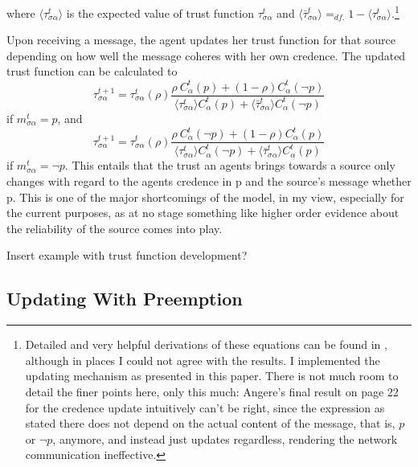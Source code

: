 \documentclass[11pt, a4paper]{article}
\newcommand{\sa}{{\sigma\alpha}}
\renewcommand{\a}{\alpha}
\begin{document}
where $\langle \tau^t_{\sa} \rangle $ is the expected value of trust function $ \tau^t_{\sa} $ and ${\langle \bar{\tau}^t_{\sa} \rangle =_{df.} 1 - \langle \tau^t_{\sa} \rangle}$.\footnote{Detailed and very helpful derivations of these equations can be found in \textcite{Angere2010}, although in places I could not agree with the results. I implemented the updating mechanism as presented in this paper. There is not much room to detail the finer points here, only this much: Angere's final result on page 22 for the credence update intuitively can't be right, since the expression as stated there does not depend on the actual content of the message, that is, $p$ or $\neg p$, anymore, and instead just updates regardless, rendering the network communication ineffective.} 

Upon receiving a message, the agent updates her trust function for that source depending on how well the message coheres with her own credence. The updated trust function can be calculated to
\[
    \tau^{t+1}_\sa = \tau^t_\sa (\rho) \frac{\rho \: C^t_\a (p) + (1 - \rho) C^t_\a (\neg p)}
    {\langle \tau^t_\sa \rangle C^t_\a(p) + \langle \bar{\tau}^t_\sa \rangle C^t_\a(\neg p)}
\]
if $m^t_{\sa} = p$, and 
\[
    \tau^{t+1}_\sa = \tau^t_\sa (\rho) \frac{\rho \: C^t_\a (\neg p) + (1 - \rho) C^t_\a (p)}
    {\langle \tau^t_\sa \rangle C^t_\a(\neg p) + \langle \bar{\tau}^t_\sa \rangle C^t_\a(p)}
\]
if $m^t_{\sa} = \neg p$. This entails that the trust an agents brings towards a source only changes with regard to the agents credence in p and the source's message whether p. This is one of the major shortcomings of the model, in my view, especially for the current purposes, as at no stage something like higher order evidence about the reliability of the source comes into play. 

Insert example with trust function development?

\subsection{Updating With Preemption}
\end{document}
